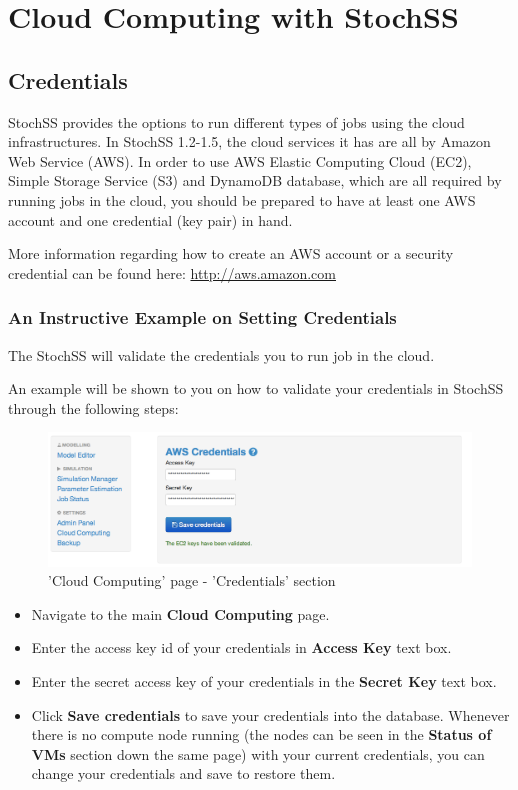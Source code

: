 \chapter{Cloud Computing with StochSS}

\section{Credentials}
StochSS provides the options to run different types of jobs using the cloud infrastructures. In StochSS 1.2-1.5, the cloud services it has are all by Amazon Web Service (AWS). In order to use AWS Elastic Computing Cloud (EC2), Simple Storage Service (S3) and DynamoDB database, which are all required by running jobs in the cloud, you should be prepared to have at least one AWS account and one credential (key pair) in hand. 

More information regarding how to create an AWS account or a security credential can be found here: \url{http://aws.amazon.com}

\subsection{An Instructive Example on Setting Credentials}
The StochSS will validate the credentials you to run job in the cloud. 

An example will be shown to you on how to validate your credentials in StochSS through the following steps:

\begin{figure}[!ht]
\centering
\includegraphics[scale=0.45]{T6/T6_fig_credentials.png}
\caption{'Cloud Computing' page - 'Credentials' section}
\label{fig:2}
\end{figure}

\begin{itemize}
\item Navigate to the main \textbf{Cloud Computing} page.
\item Enter the access key id of your credentials in \textbf{Access Key} text box.
 \item Enter the secret access key of your credentials in the \textbf{Secret Key} text box. 
 \item Click \textbf{Save credentials} to save your credentials into the database. Whenever there is no compute node running (the nodes can be seen in the \textbf{Status of VMs} section down the same page) with your current credentials, you can change your credentials and save to restore them.

\end{itemize}


